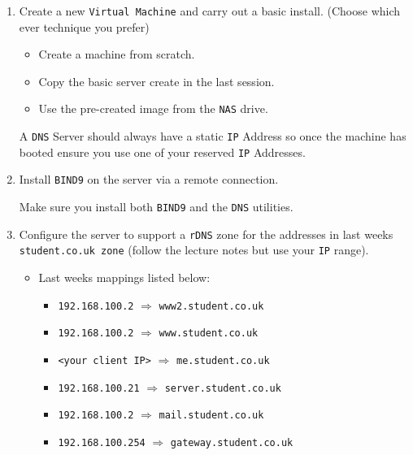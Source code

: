 \documentclass[11pt]{article}
\begin{document}
\begin{enumerate}
    \item Create a new \texttt{Virtual Machine} and carry out a basic install. (Choose which ever technique you prefer)
        \begin{itemize}
            \item Create a machine from scratch.
            \item Copy the basic server create in the last session.
            \item Use the pre-created image from the \texttt{NAS} drive.
        \end{itemize}
        \begin{tcolorbox}[title={\textbf{NOTE:}}]
            A \texttt{DNS} Server should always have a static \texttt{IP} Address so once the machine has booted ensure you use one of your reserved \texttt{IP} Addresses.
        \end{tcolorbox}
    \item Install \texttt{BIND9} on the server via a remote connection. 
        \begin{tcolorbox}[title={\textbf{NOTE:}}]
            Make sure you install both \texttt{BIND9} and the \texttt{DNS} utilities. 
        \end{tcolorbox}
    \item Configure the server to support a \texttt{rDNS} zone for the addresses in last weeks \texttt{student.co.uk zone} (follow the lecture notes but use your \texttt{IP} range).
        \begin{itemize}
            \item Last weeks mappings listed below:
            \begin{itemize}
                \item \texttt{192.168.100.2} $\Rightarrow$ \texttt{www2.student.co.uk}
                \item \texttt{192.168.100.2} $\Rightarrow$ \texttt{www.student.co.uk}
                \item \texttt{<your client IP>} $\Rightarrow$ \texttt{me.student.co.uk}
                \item \texttt{192.168.100.21} $\Rightarrow$ \texttt{server.student.co.uk}
                \item \texttt{192.168.100.2} $\Rightarrow$ \texttt{mail.student.co.uk}
                \item \texttt{192.168.100.254} $\Rightarrow$ \texttt{gateway.student.co.uk}
            \end{itemize}

\end{itemize}
\end{enumerate}
\end{document}
